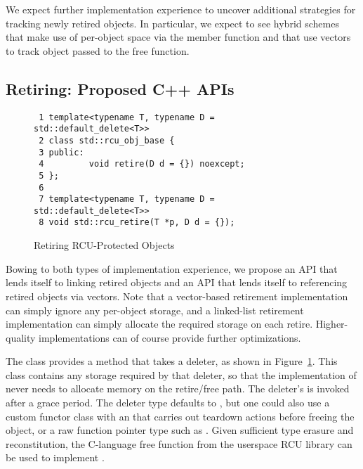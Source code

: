 \documentclass[letterpaper,10pt]{article}
\begin{document}
We expect further implementation experience to uncover additional strategies for
tracking newly retired objects.
In particular, we expect to see hybrid schemes that make use of per-object
space via the  member function and that use vectors to
track object passed to the  free function.

\subsection{Retiring: Proposed C++ APIs}
\label{sec:Retiring: Proposed C++ APIs}

\begin{figure}[tbp]
{ \scriptsize
\begin{verbatim}
 1 template<typename T, typename D = std::default_delete<T>>
 2 class std::rcu_obj_base {
 3 public:
 4         void retire(D d = {}) noexcept;
 5 };
 6
 7 template<typename T, typename D = std::default_delete<T>>
 8 void std::rcu_retire(T *p, D d = {});
\end{verbatim}
}
\caption{Retiring RCU-Protected Objects}
\label{fig:Retiring RCU-Protected Objects}
\end{figure}

Bowing to both types of implementation experience, we propose an API that
lends itself to linking retired objects and an API that lends
itself to referencing retired objects via vectors.
Note that a vector-based retirement implementation can simply ignore
any per-object storage, and a linked-list retirement implementation
can simply allocate the required storage on each retire.
Higher-quality implementations can of course provide further optimizations.

The  class provides a  method that
takes a deleter,
as shown in
Figure~\ref{fig:Retiring RCU-Protected Objects}.
This class contains any storage required by that deleter, so that
the implementation of
 never needs to allocate
memory on the retire/free path.
The deleter's  is invoked after a grace period.
The deleter type defaults to ,
but one could also use a
custom functor class with an  that carries out teardown actions
before freeing the object, or a raw function pointer type such as
.
Given sufficient type erasure and reconstitution, the 
C-language free function from the userspace RCU library can be used to
implement .
\end{document}
